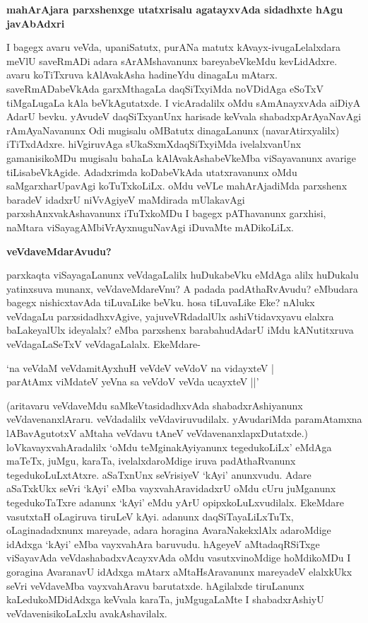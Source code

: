 {\bf mahArAjara parxshenxge utatxrisalu agatayxvAda sidadhxte hAgu javAbAdxri}

I bagegx avaru veVda, upaniSatutx, purANa matutx kAvayx-ivugaLelalxdara meVlU saveRmADi adara sArAMshavanunx bareyabeVkeMdu kevLidAdxre. avaru koTiTxruva kAlAvakAsha hadineYdu dinagaLu mAtarx. saveRmADabeVkAda garxMthagaLa daqSiTxyiMda noVDidAga eSoTxV tiMgaLugaLa kAla beVkAgutatxde. I vicAradalilx oMdu sAmAnayxvAda aiDiyA AdarU bevku. yAvudeV daqSiTxyanUnx harisade keVvala shabadxpArAyaNavAgi rAmAyaNavanunx Odi mugisalu oMBatutx dinagaLanunx (navarAtirxyalilx) iTiTxdAdxre. hiVgiruvAga sUkaSxmXdaqSiTxyiMda ivelalxvanUnx gamanisikoMDu mugisalu bahaLa kAlAvakAshabeVkeMba viSayavanunx avarige tiLisabeVkAgide. Adadxrimda koDabeVkAda utatxravanunx oMdu saMgarxharUpavAgi koTuTxkoLiLx. oMdu veVLe mahArAjadiMda parxshenx baradeV idadxrU niVvAgiyeV maMdirada mUlakavAgi parxshAnxvakAshavanunx iTuTxkoMDu I bagegx pAThavanunx garxhisi, naMtara viSayagAMbiVrAyxnuguNavAgi iDuvaMte mADikoLiLx.

{\bf veVdaveMdarAvudu?}

parxkaqta viSayagaLanunx veVdagaLalilx huDukabeVku eMdAga alilx huDukalu yatinxsuva munanx, veVdaveMdareVnu? A padada padAthaRvAvudu? eMbudara bagegx nishicxtavAda tiLuvaLike beVku. hosa tiLuvaLike Eke? nAlukx veVdagaLu parxsidadhxvAgive, yajuveVRdadalUlx ashiVtidavxyavu elalxra baLakeyalUlx ideyalalx? eMba parxshenx barabahudAdarU iMdu kANutitxruva veVdagaLaSeTxV veVdagaLalalx. EkeMdare-

\begin{shloka}
`na veVdaM veVdamitAyxhuH veVdeV veVdoV na vidayxteV |\\
parAtAmx viMdateV yeVna sa veVdoV veVda ucayxteV ||'
\end{shloka}

(aritavaru veVdaveMdu saMkeVtasidadhxvAda shabadxrAshiyanunx veVdavenanxlAraru. veVdadalilx veVdaviruvudilalx. yAvudariMda paramAtamxna lABavAgutotxV aMtaha veVdavu tAneV veVdavenanxlapxDutatxde.) loVkavayxvahAradalilx `oMdu teMginakAyiyanunx tegedukoLiLx' eMdAga maTeTx, juMgu, karaTa, ivelalxdaroMdige iruva padAthaRvanunx tegedukoLuLxtAtxre. aSaTxnUnx seVrisiyeV `kAyi' anunxvudu. Adare aSaTxkUkx seVri `kAyi' eMba vayxvahAravidadxrU oMdu cUru juMganunx tegedukoTaTxre adanunx `kAyi' eMdu yArU opipxkoLuLxvudilalx. EkeMdare vasutxtaH oLagiruva tiruLeV kAyi. adanunx daqSiTayaLiLxTuTx, oLaginadadxnunx mareyade, adara horagina AvaraNakekxlAlx adaroMdige idAdxga `kAyi' eMba vayxvahAra baruvudu. hAgeyeV aMtadaqRSiTxge viSayavAda veVdashabadxvAcayxvAda oMdu vasutxvinoMdige hoMdikoMDu I goragina AvaranavU idAdxga mAtarx aMtaHsAravanunx mareyadeV elalxkUkx seVri veVdaveMba vayxvahAravu barutatxde. hAgilalxde tiruLanunx kaLedukoMDidAdxga keVvala karaTa, juMgugaLaMte I shabadxrAshiyU veVdavenisikoLaLxlu avakAshavilalx.

